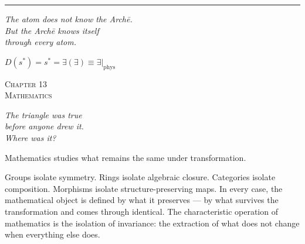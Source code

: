 \documentclass[10pt, openany, oneside]{book}
\renewcommand{\large}{\fontsize{11.5}{14}\selectfont}
\renewcommand{\huge}{\fontsize{17}{21}\selectfont}
\begin{document}
\vspace{2em}

\begin{center}
    \rule{0.15\textwidth}{0.3pt}
\end{center}

\vspace{0.5em}

\begin{center}
    \itshape
    The atom does not know the Arch\={e}.\\
    But the Arch\={e} knows itself\\
    through every atom.
\end{center}

\vspace{0.5em}

\begin{center}
    $D(s^*) = s^* = \exists(\exists) \equiv \exists|_{\text{phys}}$
\end{center}


%
%
%

\newpage

\begin{center}
    {\huge\scshape Chapter 13}\\[0.3em]
    {\large\scshape Mathematics}
\end{center}

\vspace{1.5em}

\begin{center}
    \itshape
    The triangle was true\\
    before anyone drew it.\\
    Where was it?
\end{center}

\vspace{2em}


\noindent Mathematics studies what remains the same under transformation.

Groups isolate symmetry. Rings isolate algebraic closure. Categories isolate composition. Morphisms isolate structure-preserving maps. In every case, the mathematical object is defined by what it preserves --- by what survives the transformation and comes through identical. The characteristic operation of mathematics is the isolation of invariance: the extraction of what does not change when everything else does.
\end{document}
